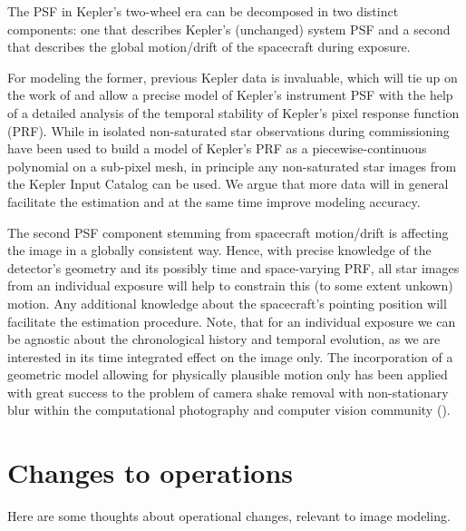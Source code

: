 \documentclass[letterpaper,12pt,whitepaper]{haastex}
\begin{document}
The PSF in Kepler's two-wheel era can be decomposed in two distinct
components: one that describes Kepler's (unchanged) system PSF and a
second that describes the global motion/drift of the spacecraft during
exposure.

For modeling the former, previous Kepler data is invaluable, which
will tie up on the work of \cite{bryson2010} and allow a precise model
of Kepler's instrument PSF with the help of a detailed analysis of the
temporal stability of Kepler's pixel response function (PRF). While in
\cite{bryson2010} isolated non-saturated star observations during
commissioning have been used to build a model of Kepler's PRF as a
piecewise-continuous polynomial on a sub-pixel mesh, in principle any
non-saturated star images from the Kepler Input Catalog can be
used. We argue that more data will in general facilitate the
estimation and at the same time improve modeling accuracy.

The second PSF component stemming from spacecraft motion/drift is
affecting the image in a globally consistent way. Hence, with precise
knowledge of the detector's geometry and its possibly time and
space-varying PRF, all star images from an individual exposure will
help to constrain this (to some extent unkown) motion. Any additional
knowledge about the spacecraft's pointing position will facilitate the
estimation procedure. Note, that for an individual exposure we can be
agnostic about the chronological history and temporal evolution, as we
are interested in its time integrated effect on the image only. The
incorporation of a geometric model allowing for physically plausible
motion only has been applied with great success to the problem of
camera shake removal with non-stationary blur within the computational
photography and computer vision community
(\citealt{fergus2006,whyte2010,hirsch2011,koehler2012}).




\section{Changes to operations}\label{sec:operations}

Here are some thoughts about operational changes, relevant to image
modeling.
\end{document}
